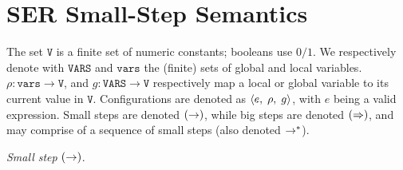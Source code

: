 \section{SER Small-Step Semantics}
\label{appendix:ser-semantics}

%
%
The set \(\texttt{V}\) is a finite set of numeric constants; booleans use $0/1$. We respectively denote with \(\texttt{VARS}\) and \(\texttt{vars}\) the (finite) sets of global and local variables. $\rho:{\texttt{vars}}\to \texttt{V}$, and $g:{\texttt{VARS}}\to \texttt{V}$ respectively map a local or global variable to its current value in \(\texttt{V}\).
%
Configurations are denoted as $\langle e,\; \rho,\; g\rangle$, with \(e\) being a valid \toolname{} expression. 
%
Small steps are denoted $(\mathrel{\rightarrow})$, while big steps are denoted $(\mathrel{\Rightarrow})$, and may comprise of a sequence of small steps (also denoted $\mathrel{\rightarrow}^{*}$).
%
%

\smallskip
\noindent\textit{Small step} $(\mathrel{\rightarrow})$.
	
